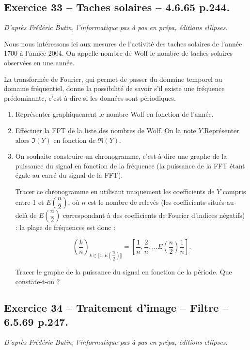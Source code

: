 \documentclass[10pt,fleqn]{article} %
\begin{document}
\begin{multicols}{2}
\subsection*{Exercice 33 -- Taches solaires -- 4.6.65 p.244.}
\begin{flushright}
\textit{D'après Frédéric Butin, l'informatique pas à pas en prépa, éditions ellipses.}
\end{flushright}
Nous nous intéressons ici aux mesures de l'activité des taches solaires de l'année 1700 à l'année 2004. On appelle nombre de Wolf le nombre de taches solaires observées en une année. %

La transformée de Fourier, qui permet de passer du domaine temporel au domaine fréquentiel, donne la possibilité de savoir s'il existe une fréquence prédominante, c'est-à-dire si les données sont périodiques.

\begin{enumerate}
\item Représenter graphiquement le nombre Wolf en fonction de l'année. 
\item Effectuer la FFT de la liste des nombres de Wolf. On la note $Y$.Représenter alors $\mathfrak{I}\left(Y\right)$ en fonction de $\mathfrak{R}\left(Y\right)$.
\item On souhaite construire un chronogramme, c'est-à-dire une graphe de la puissance du signal en fonction de la fréquence (la puissance de la FFT étant égale au carré du signal de la FFT). 

Tracer ce chronogramme en utilisant uniquement les coefficients de $Y$ compris entre 1 et $E\left(\dfrac{n}{2}\right)$, où $n$ est le nombre de relevés (les coefficients situés au-delà de $E\left(\dfrac{n}{2}\right)$ correspondant à des coefficients de Fourier d'indices négatifs) : la plage de fréquences est donc :

$$
\left( \dfrac{k}{n} \right)_{k\in \llbracket 1, E\left(\dfrac{n}{2}\right) \rrbracket} = \left[ \dfrac{1}{n},\dfrac{2}{n},\ldots E\left(\dfrac{n}{2}\right) \dfrac{1}{n}\right].
$$

Tracer le graphe de la puissance du signal en fonction de la période. Que constate-t-on ?
\end{enumerate}

\subsection*{Exercice 34 -- Traitement d'image -- Filtre -- 6.5.69 p.247.}
\begin{flushright}
\textit{D'après Frédéric Butin, l'informatique pas à pas en prépa, éditions ellipses.}
\end{flushright}


\end{multicols}
\end{document}
